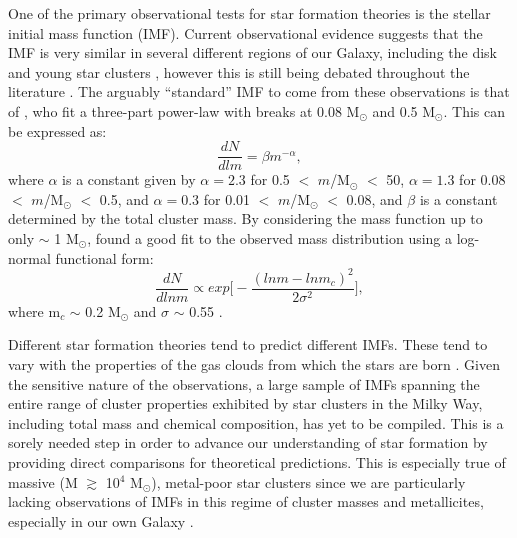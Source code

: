 One of the primary
observational tests for star formation theories is the stellar initial 
mass function (IMF).  Current observational evidence suggests that the
IMF is very similar in several different regions of our Galaxy,
including the disk and young star clusters
\citep[e.g.][]{elmegreen99}, however this is still being debated
throughout the literature \citep[e.g.][]{scalo98}.  The arguably
``standard'' IMF to come from these observations is that of
\citet{kroupa01}, who fit a three-part 
power-law with breaks at 0.08 M$_{\odot}$ and 0.5 M$_{\odot}$.  This
can be expressed as:
\begin{equation}
\label{eqn:kroupa}
\frac{dN}{dlm} = {\beta}m^{-\alpha},
\end{equation}
where
$\alpha$ is a constant given by $\alpha = 2.3$ for 0.5 $<$
$m$/M$_{\odot}$ $<$ 50, $\alpha = 1.3$ for 0.08 $<$
$m$/M$_{\odot}$ $<$ 0.5, and $\alpha = 0.3$ for 0.01 $<$
$m$/M$_{\odot}$ $<$ 0.08, and $\beta$ is a constant determined by the
total cluster mass.  By considering the mass function up to only
$\sim$ 1 M$_{\odot}$, \citet{miller79} found a good fit to the
observed mass distribution using a log-normal functional form:
\begin{equation}
\label{eqn:miller}
\frac{dN}{dlnm} \propto exp\Big[-\frac{(lnm-lnm_c)^2}{2\sigma^2}\big],
\end{equation}
where m$_c$ $\sim$ 0.2 M$_{\odot}$ and $\sigma$ $\sim$ 0.55
\citep{chabrier05}.  

Different star formation theories tend to predict different IMFs.  These
tend to vary with the properties of the gas clouds from which the
stars are born \citep[e.g.][]{elmegreen01, bonnell07}.  Given the
sensitive nature of the observations, a
large sample of IMFs spanning the entire range of cluster properties
exhibited by star clusters in the Milky Way, 
including total mass and chemical composition, has yet to be
compiled.  %
This is a sorely needed step in order to advance our understanding
of star formation by providing direct comparisons for theoretical 
predictions.  This is especially true of massive (M $\gtrsim$ 10$^4$
M$_{\odot}$), metal-poor star clusters since we are particularly
lacking observations of IMFs in this regime of cluster masses and
metallicites, especially in our own Galaxy \citep[e.g.][]{mckee07,
  portegieszwart10}.   

